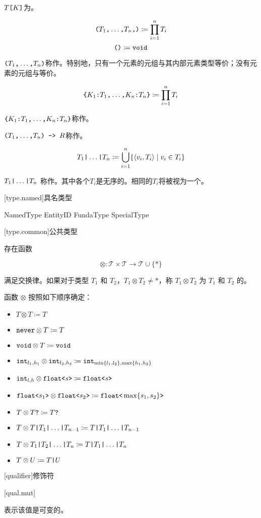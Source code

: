 \pnum
$T\texttt{[}K\texttt{]}$为。

$$ \texttt{(}T_1\texttt{,} \ldots\texttt{,} T_n\texttt{,}\texttt{)} \coloneqq \prod^n_{i=1} T_i $$
$$ \texttt{()} \coloneqq \texttt{void} $$

\pnum
$\texttt{(}T_1\texttt{,} \ldots\texttt{,} T_n\texttt{)}$称作。特别地，只有一个元素的元组与其内部元素类型等价；没有元素的元组与等价。

$$ \texttt{\{} K_1\texttt{:}T_1\texttt{,} \ldots\texttt{,} K_n\texttt{:}T_n \texttt{\}} \coloneqq \prod^n_{i=1} T_i $$

\pnum
$\texttt{\{}K_1\texttt{:}T_1\texttt{,} \ldots\texttt{,} K_n\texttt{:}T_n\texttt{\}}$称作。

\pnum
$\texttt{(}T_1\texttt{,} \ldots\texttt{,} T_n\texttt{) -> }R$称作。

$$ T_1 \texttt{|} \ldots \texttt{|} T_n \coloneqq \bigcup^n_{i=1} \{ \langle v_i, T_i \rangle \mid v_i \in T_i \} $$

\pnum
$T_1\texttt{|}\ldots\texttt{|}T_n$ 称作。其中各个$T_i$是无序的。相同的$T_i$将被视为一个。

[type.named]{具名类型}

\begin{bnf}{NamedType}
    EntityID \br
    FundaType \br
    SpecialType
\end{bnf}

[type.common]{公共类型}

\pnum
存在函数

$$ \otimes: \mathcal{T} \times \mathcal{T} \rightarrow \mathcal{T} \cup \{ \ast \} $$

满足交换律。如果对于类型 $T_1$ 和 $T_2$，$T_1 \otimes T_2 \ne \ast$，称 $T_1 \otimes T_2$ 为 $T_1$ 和 $T_2$ 的。

\pnum
函数 $\otimes$ 按照如下顺序确定：

\begin{itemize}
\item $T \otimes T \coloneqq T$
\item $\texttt{never} \otimes T \coloneqq T$
\item $\texttt{void} \otimes T \coloneqq \texttt{void}$
\item $\texttt{int}_{l_1,h_1} \otimes \texttt{int}_{l_2,h_2} \coloneqq \texttt{int}_{\min\{l_1, l_2\},\max\{h_1, h_2\}}$
\item $\texttt{int}_{l,h} \otimes \texttt{float<}s\texttt{>} \coloneqq \texttt{float<}s\texttt{>}$
\item $\texttt{float<}s_1\texttt{>} \otimes \texttt{float<}s_2\texttt{>} \coloneqq \texttt{float<}\max\{s_1, s_2\}\texttt{>}$
\item $T \otimes T\texttt{?} \coloneqq T\texttt{?}$
\item $T \otimes T \texttt{|} T_1 \texttt{|} \ldots \texttt{|} T_{n-1} \coloneqq T \texttt{|} T_1 \texttt{|} \ldots \texttt{|} T_{n-1}$
\item $T \otimes T_1 \texttt{|} T_2 \texttt{|} \ldots \texttt{|} T_n \coloneqq T \texttt{|} T_1 \texttt{|} \ldots \texttt{|} T_n$
\item $T \otimes U \coloneqq T \texttt{|} U$
\end{itemize}

[qualifier]{修饰符}

[qual.mut]{}

\pnum
{} 表示该值是可变的。
